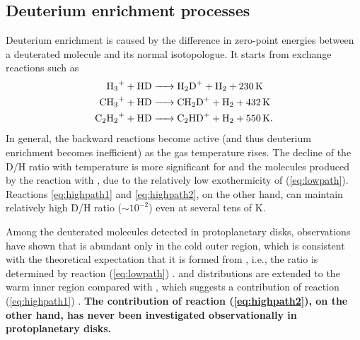\documentclass[12pt,a4paper]{article}  %
\begin{document}
\subsection{Deuterium enrichment processes}
Deuterium enrichment is caused by the difference in zero-point energies between a deuterated molecule and its normal isotopologue. It starts from exchange reactions such as
\begin{align}
    \ce{H3+ + HD &-> H2D+ + H2} + 230\, \mathrm{K} \label{eq:lowpath}\\
    \ce{CH3+ + HD &-> CH2D+ + H2} + 432\, \mathrm{K} \label{eq:highpath1} \\ 
    \ce{C2H2+ + HD &-> C2HD+ + H2} + 550\, \mathrm{K}. \label{eq:highpath2}
\end{align}
In general, the backward reactions become active (and thus deuterium enrichment becomes inefficient) as the gas temperature rises. The decline of the D/H ratio with temperature is more significant for  and the molecules produced by the reaction with , due to the relatively low exothermicity of (\ref{eq:lowpath}). Reactions \eqref{eq:highpath1} and \eqref{eq:highpath2}, on the other hand, can maintain relatively high D/H ratio ($\sim 10^{-2}$) even at several tens of K.

Among the deuterated molecules detected in protoplanetary disks, observations have shown that  is abundant only in the cold outer region, which is consistent with the theoretical expectation that it is formed from , i.e., the  ratio is determined by reaction (\ref{eq:lowpath}) \cite[e.g.,][]{Salinas17}.  and  distributions are extended to the warm inner region compared with , which suggests a contribution of reaction (\ref{eq:highpath1}) \cite[e.g.,][]{Huang17, Oberg21_TWHya, Cataldi21}. \textbf{The contribution of reaction (\ref{eq:highpath2}), on the other hand, has never been investigated observationally in protoplanetary disks.}

\vspace{-1em}
\end{document}
